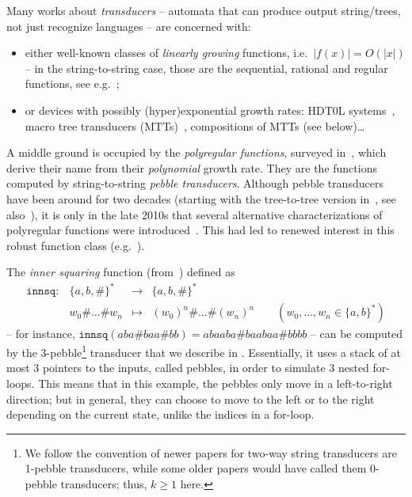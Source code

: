 \documentclass{fundam}
\theoremstyle{claimstyle}
\newcommand\innsq{\mathtt{innsq}}
\begin{document}
Many works about \emph{transducers} -- automata that can produce output string/trees, not just recognize languages -- are concerned with:
\begin{itemize}
  \item either well-known classes of \emph{linearly growing} functions, i.e.\ $|f(x)| = O(|x|)$ -- in the string-to-string case, those are the sequential, rational and regular functions, see e.g.~\cite{MuschollPuppis};
  \item or devices with possibly (hyper)exponential growth rates: HDT0L systems~\cite{FerteMarinSenizergues,CopyfulSST,Marble}, macro tree transducers (MTTs)~\cite{Macro}, compositions of MTTs (see below)…
\end{itemize}
A middle ground is occupied by the \emph{polyregular functions}, surveyed
in~\cite{PolyregSurvey}, which derive their name from their \emph{polynomial}
growth rate. They are the functions computed by string-to-string \emph{pebble
  transducers}. Although pebble transducers have been around for two decades
(starting with the tree-to-tree version in~\cite{Pebble}, see
also~\cite{EngelfrietPebbleMacro,PebbleString,PebbleComposition}), it is only in
the late 2010s that several alternative characterizations of polyregular
functions were introduced~\cite{polyregular,msoInterpretations}. This had led to
renewed interest in this robust function class (e.g.~\cite{Zpolyreg,JordonPhD,Reduplication}).
\begin{example}
  \label{exa:innsq}
  The \emph{inner squaring} function (from~{\cite[\S6.2]{PolyregSurvey}})
  defined as
  \[ \begin{array}{llcl}
    \innsq\colon& \{a,b,\#\}^* &\to& \{a,b,\#\}^*\\
    & w_0 \# \dots \# w_n &\mapsto& (w_0)^n \# \dots \# (w_n)^n \qquad (w_0,\dots,w_n \in \{a,b\}^*)
     \end{array} \]
   -- for instance, $\innsq(aba\#baa\#bb) = abaaba\#baabaa\#bbbb$ -- can be computed by the 3-pebble\footnote{\label{ftn:off-by-one}We
     follow the convention of newer papers for two-way string transducers are
     1-pebble transducers, while some older papers would have called them 0-pebble
     transducers; thus, $k\geq1$ here.} transducer that we describe in
   . Essentially, it uses a stack of at most 3 pointers to the
   inputs, called pebbles, in order to simulate 3 nested for-loops. This means
   that in this example, the pebbles only move in a left-to-right direction; but in
   general, they can choose to move to the left or to the right depending on the
   current state, unlike the indices in a for-loop.
\end{example}
\end{document}
